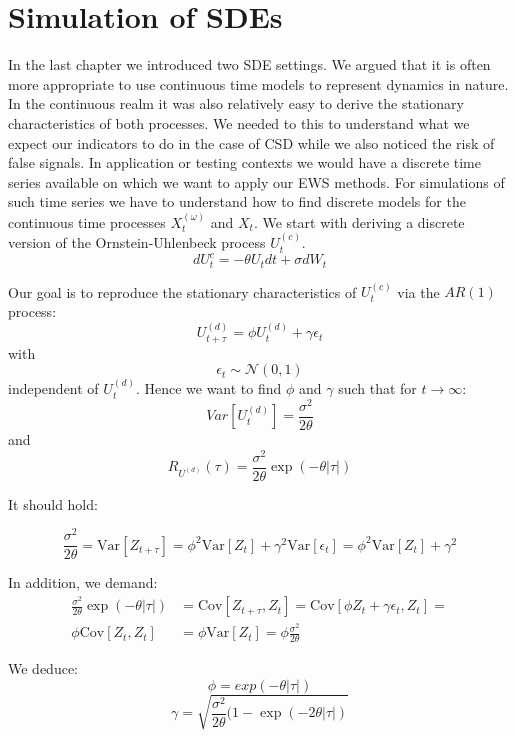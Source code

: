 \documentclass[%
thesis=student,%
coverpage=false,%
titlepage=false,%
headmarks=true, %
german,%
font=libertine, %
math=newpxtx, %
BCOR=5mm,%
coverBCOR=11mm%
]{tumbook}
\begin{document}
\chapter{Simulation of SDEs}

In the last chapter we introduced two SDE settings. We argued that it is often more appropriate to use continuous time models to represent dynamics in nature. In the continuous realm it was also relatively easy to derive the stationary characteristics of both processes. We needed to this to understand what we expect our indicators to do in the case of CSD while we also noticed the risk of false signals. 
In application or testing contexts we would have a discrete time series available on which we want to apply our EWS methods. For simulations of such time series we have to understand how to find discrete models for the continuous time processes $X_{t}^{(\omega)}$ and $X_{t}$. We start with deriving a discrete version of the Ornstein-Uhlenbeck process $U_{t}^{(c)}$.
\[
dU_{t}^{c} = -\theta U_{t}dt + \sigma dW_{t} 
\]

Our goal is to reproduce the stationary characteristics of $U_{t}^{(c)}$  via the $AR(1)$ process:
\[
     U_{t+\tau}^{(d)} = \phi U_{t} ^{(d)}+ \gamma \epsilon_{t} 
\]
with 
\[
\epsilon_{t} \sim \mathcal{N}(0,1)
\]
independent of $U_{t}^{(d)}$.
Hence we want to find $\phi$ and $\gamma$ such that for $t \rightarrow \infty$:
\[
Var[U_{t}^{(d)}] = \frac{\sigma^{2}}{2\theta}
\]
and 
\[
R_{U^{(d)}}(\tau) = \frac{\sigma ^2}{2\theta}\exp(-\theta\lvert \tau \rvert)
\]

It should hold:

\begin{equation*}
    \frac{\sigma^2}{2\theta} = \text{Var}[Z_{t+\tau}] = \phi ^2 \text{Var}[Z_{t}] + \gamma ^2 \text{Var}[\epsilon_{t}] = \phi ^2 \text{Var}[Z_{t}] + \gamma ^2
\end{equation*}

In addition, we demand: 
  \begin{align*} 
      \frac{\sigma ^2}{2\theta}\exp(-\theta\lvert \tau \rvert) &= \text{Cov}[Z_{t+\tau},Z_{t}] = \text{Cov}[\phi Z_{t} + \gamma \epsilon_{t}, Z_{t}] = \\
      \phi\text{Cov}[Z_{t},Z_{t}] &= \phi \text{Var}[Z_{t}] = \phi \frac{\sigma^2}{2\theta}
  \end{align*}




We deduce: 
    \[
        \phi = exp(-\theta \lvert \tau \rvert)
    \]
    \[
        \gamma = \sqrt{\frac{\sigma^{2}}{2\theta}(1-\exp(-2\theta \lvert \tau \rvert)}
    \]
\end{document}
